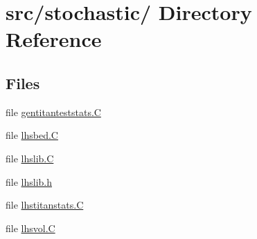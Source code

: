 \hypertarget{dir_000009}{
\section{src/stochastic/ Directory Reference}
\label{dir_000009}
}
\subsection*{Files}
\begin{CompactItemize}
\item 
file \hyperlink{gentitanteststats_8C}{gentitanteststats.C}
\item 
file \hyperlink{lhsbed_8C}{lhsbed.C}
\item 
file \hyperlink{lhslib_8C}{lhslib.C}
\item 
file \hyperlink{lhslib_8h}{lhslib.h}
\item 
file \hyperlink{lhstitanstats_8C}{lhstitanstats.C}
\item 
file \hyperlink{lhsvol_8C}{lhsvol.C}
\end{CompactItemize}
